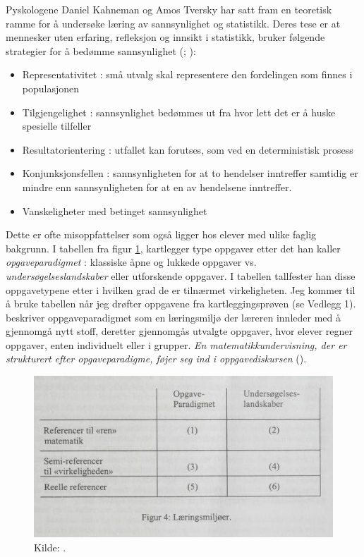 \documentclass[main.tex]{subfiles}
\begin{document}
Pyskologene Daniel Kahneman og Amos Tversky har satt fram en teoretisk ramme for å undersøke 
læring av sannsynlighet og statistikk. Deres tese er at mennesker uten erfaring, refleksjon og innsikt i statistikk,
bruker følgende strategier for å bedømme sannsynlighet (; ):
\begin{itemize}
\item Representativitet : små utvalg skal representere den fordelingen som finnes i populasjonen
\item Tilgjengelighet : sannsynlighet bedømmes ut fra hvor lett det er å huske spesielle tilfeller
\item Resultatorientering : utfallet kan forutses, som ved en deterministisk prosess
\item Konjunksjonsfellen : sannsynligheten for at to hendelser inntreffer samtidig er mindre enn sannsynligheten
for at en av hendelsene inntreffer.
\item Vanskeligheter med betinget sannsynlighet
\end{itemize}
Dette er ofte misoppfattelser som også ligger hos elever med ulike faglig bakgrunn.
I tabellen fra figur \ref{fig:skov98}, kartlegger  type oppgaver etter det han kaller 
\emph{opgaveparadigmet} :
klassiske åpne og lukkede oppgaver vs. \emph{undersøgelseslandskaber} eller utforskende oppgaver. I tabellen tallfester
han disse oppgavetypene etter i hvilken grad de er tilnærmet virkeligheten. Jeg kommer til å bruke tabellen når jeg
drøfter oppgavene fra kartleggingsprøven (se Vedlegg 1).  beskriver oppgaveparadigmet som
en læringsmiljø der læreren innleder med å gjennomgå nytt stoff, deretter gjennomgås utvalgte oppgaver, hvor elever 
regner oppgaver, enten individuelt eller i grupper. \emph{En matematikkundervisning, der er strukturert efter 
opgaveparadigme, føjer seg ind i \guillemotleft oppgavediskursen\guillemotright} ().
\begin{figure}[h!]
\centering
\includegraphics[scale = 0.9]{../figures/laeringsmiljoer.png}
\caption{Kilde: \protect{}.}
\label{fig:skov98}
\end{figure}
\end{document}
